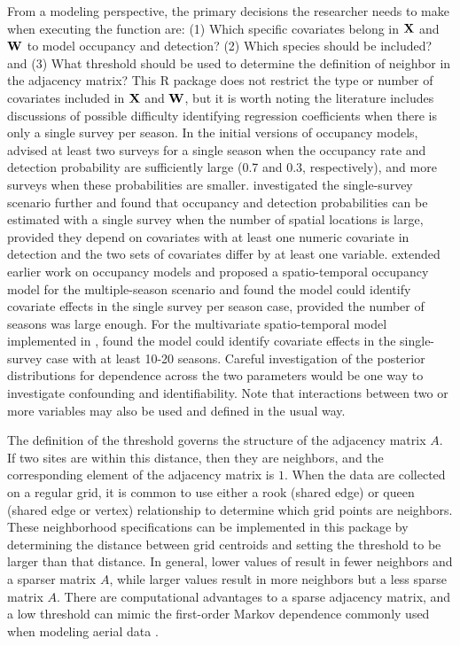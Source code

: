 From a modeling perspective, the primary decisions the researcher needs to make when executing the  function are: (1) Which specific covariates belong in ${\bf X}$ and ${\bf W}$ to model occupancy and detection? (2) Which species should be included? and (3) What threshold should be used to determine the definition of neighbor in the adjacency matrix? This R package does not restrict the type or number of covariates included in ${\bf X}$ and ${\bf W}$, but it is worth noting the literature includes discussions of possible difficulty identifying regression coefficients when there is only a single survey per season. In the initial versions of occupancy models, \citet{mackenzie2002} advised at least two surveys for a single season when the occupancy rate and detection probability are sufficiently large (0.7 and 0.3, respectively), and more surveys when these probabilities are smaller.  \citet{lele2012} investigated the single-survey scenario further and found that occupancy and detection probabilities can be estimated with a single survey when the number of spatial locations is large, provided they depend on covariates with at least one numeric covariate in detection and the two sets of covariates differ by at least one variable. \citet{hepler2018} extended earlier work on occupancy models and proposed a spatio-temporal occupancy model for the multiple-season scenario and found the model could identify covariate effects in the single survey per season case, provided the number of seasons was large enough. For the multivariate spatio-temporal model implemented in , \citet{hepler2021spatiotemporal} found the model could identify covariate effects in the single-survey case with at least 10-20 seasons. Careful investigation of the posterior distributions for dependence across the two parameters would be one way to investigate confounding and identifiability. Note that interactions between two or more variables may also be used and defined in the usual way. 

The definition of the threshold governs the structure of the adjacency matrix $A$.  If two sites are within this distance, then they are neighbors, and the corresponding element of the adjacency matrix is $1$. When the data are collected on a regular grid, it is common to use either a rook (shared edge) or queen (shared edge or vertex) relationship to determine which grid points are neighbors. These neighborhood specifications can be implemented in this package by determining the distance between grid centroids and setting the threshold to be larger than that distance. In general, lower values of  result in fewer neighbors and a sparser matrix $A$, while larger values result in more neighbors but a less sparse matrix $A$.  There are computational advantages to a sparse adjacency matrix, and a low threshold can mimic the first-order Markov dependence commonly used when modeling aerial data  \citep{gelfand2010handbook}.

